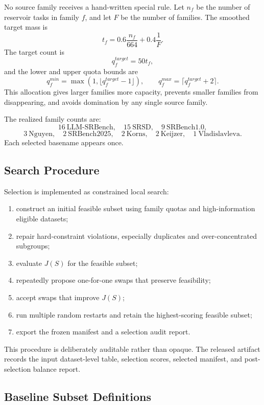 No source family receives a hand-written special rule. Let \(n_f\) be the number of reservoir tasks in family \(f\), and let \(F\) be the number of families. The smoothed target mass is
\[
t_f
=
0.6\frac{n_f}{664}
+
0.4\frac{1}{F}.
\]
The target count is
\[
q_f^{target}
=
50t_f,
\]
and the lower and upper quota bounds are
\[
q_f^{min}
=
\max(1,\lfloor q_f^{target}-1\rfloor),
\qquad
q_f^{max}
=
\lceil q_f^{target}+2\rceil.
\]
This allocation gives larger families more capacity, prevents smaller families from disappearing, and avoids domination by any single source family.

The realized \core{} family counts are:
\[
16\ \mathrm{LLM\mbox{-}SRBench},
\quad
15\ \mathrm{SRSD},
\quad
9\ \mathrm{SRBench1.0},
\]
\[
3\ \mathrm{Nguyen},
\quad
2\ \mathrm{SRBench2025},
\quad
2\ \mathrm{Korns},
\quad
2\ \mathrm{Keijzer},
\quad
1\ \mathrm{Vladislavleva}.
\]
Each selected basename appears once.


\subsection{Search Procedure}
\label{app:core50-search}

Selection is implemented as constrained local search:
\begin{enumerate}[leftmargin=*]
    \item construct an initial feasible subset using family quotas and high-information eligible datasets;
    \item repair hard-constraint violations, especially duplicates and over-concentrated subgroups;
    \item evaluate \(J(S)\) for the feasible subset;
    \item repeatedly propose one-for-one swaps that preserve feasibility;
    \item accept swaps that improve \(J(S)\);
    \item run multiple random restarts and retain the highest-scoring feasible subset;
    \item export the frozen manifest and a selection audit report.
\end{enumerate}

This procedure is deliberately auditable rather than opaque. The released artifact records the input dataset-level table, selection scores, selected manifest, and post-selection balance report.


\subsection{Baseline Subset Definitions}
\label{app:baseline-selectors}

